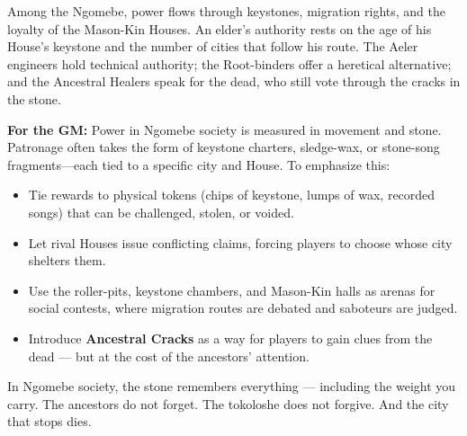 \begin{tcolorbox}[colback=black!3,colframe=black!40!white,title={Patronage \& Power},breakable]
Among the Ngomebe, power flows through keystones, migration rights, and the loyalty of the Mason-Kin Houses. An elder's authority rests on the age of his House's keystone and the number of cities that follow his route. The Aeler engineers hold technical authority; the Root-binders offer a heretical alternative; and the Ancestral Healers speak for the dead, who still vote through the cracks in the stone.

\textbf{For the GM:}  
Power in Ngomebe society is measured in movement and stone. Patronage often takes the form of keystone charters, sledge-wax, or stone-song fragments---each tied to a specific city and House. To emphasize this:
\begin{itemize}
\item Tie rewards to physical tokens (chips of keystone, lumps of wax, recorded songs) that can be challenged, stolen, or voided.
\item Let rival Houses issue conflicting claims, forcing players to choose whose city shelters them.
\item Use the roller-pits, keystone chambers, and Mason-Kin halls as arenas for social contests, where migration routes are debated and saboteurs are judged.
\item Introduce \textbf{Ancestral Cracks} as a way for players to gain clues from the dead --- but at the cost of the ancestors' attention.
\end{itemize}
In Ngomebe society, the stone remembers everything --- including the weight you carry. The ancestors do not forget. The tokoloshe does not forgive. And the city that stops dies.
\end{tcolorbox}

